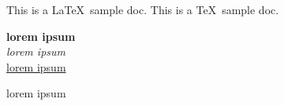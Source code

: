 \documentclass[letterpaper,12pt,oneside]{report}
\begin{document}
This is a \LaTeX~sample doc.  \newline
This is a \TeX~sample doc.  \newline

\textbf{lorem ipsum} \\
\textit{lorem ipsum} \\
\underline{lorem ipsum}

lorem ipsum
\end{document}
